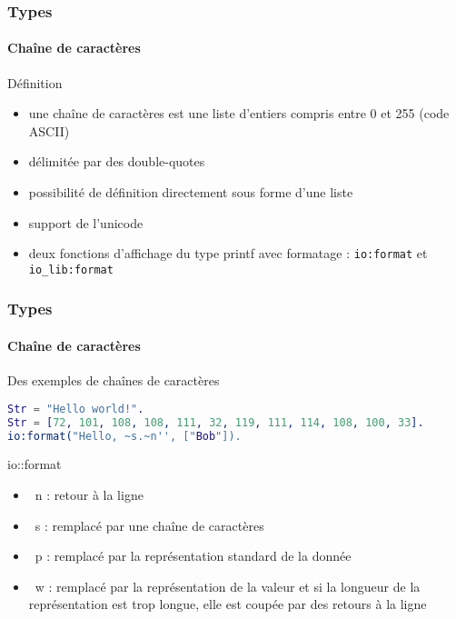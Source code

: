 \begin{frame}
  \frametitle{Types}
  \framesubtitle{Chaîne de caractères}

  \begin{block}{Définition}
    \begin{itemize}
      \item une chaîne de caractères est une liste d'entiers compris entre 0
        et 255 (code ASCII)
      \item délimitée par des double-quotes
      \item possibilité de définition directement sous forme d'une liste
      \item support de l'unicode
      \item deux fonctions d'affichage du type printf avec formatage :
        \texttt{io:format} et \texttt{io\_lib:format}
    \end{itemize}
  \end{block}

\end{frame}

\begin{frame}[fragile]
  \frametitle{Types}
  \framesubtitle{Chaîne de caractères}

  \begin{exampleblock}{Des exemples de chaînes de caractères}
    \begin{lstlisting}[language=erlang]
Str = "Hello world!".
Str = [72, 101, 108, 108, 111, 32, 119, 111, 114, 108, 100, 33].
io:format("Hello, ~s.~n'', ["Bob"]).
    \end{lstlisting}
  \end{exampleblock}

  \begin{alertblock}{io::format}
    \begin{itemize}
    \item ~n : retour à la ligne
    \item ~s : remplacé par une chaîne de caractères
    \item ~p : remplacé par la représentation standard de la donnée
    \item ~w : remplacé par la représentation de la valeur et si la longueur
      de la représentation est trop longue, elle est coupée par des retours
      à la ligne
    \end{itemize}
  \end{alertblock}

\end{frame}

